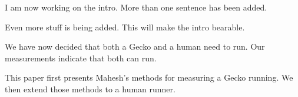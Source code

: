 I am now working on the intro. More than one sentence has been added.

Even more stuff is being added. This will make the intro bearable.

We have now decided that both a Gecko and a human need to run. Our measurements indicate that both can run.

This paper first presents Mahesh's methods for measuring a Gecko running. We then extend those methods to a human runner.